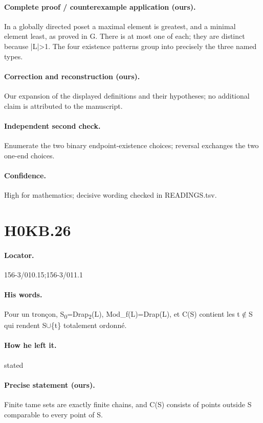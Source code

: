\paragraph{Complete proof / counterexample application (ours).} In a globally directed poset a maximal element is greatest, and a minimal element least, as proved in G. There is at most one of each; they are distinct because |L|>1. The four existence patterns group into precisely the three named types.

\paragraph{Correction and reconstruction (ours).} Our expansion of the displayed definitions and their hypotheses; no additional claim is attributed to the manuscript.

\paragraph{Independent second check.} Enumerate the two binary endpoint-existence choices; reversal exchanges the two one-end choices.

\paragraph{Confidence.} High for mathematics; decisive wording checked in READINGS.tsv.

\section*{H0KB.26}\label{statement:H0KB.26}
\paragraph{Locator.} 156-3/010.15;156-3/011.1

\paragraph{His words.} Pour un tronçon, S\textsubscript{0}=Drap\textsubscript{2}(L), Mod\_f(L)=Drap(L), et C(S) contient les t\ensuremath{\notin}S qui rendent S\ensuremath{\cup}\{t\} totalement ordonné.

\paragraph{How he left it.} stated

\paragraph{Precise statement (ours).} Finite tame sets are exactly finite chains, and C(S) consists of points outside S comparable to every point of S.

